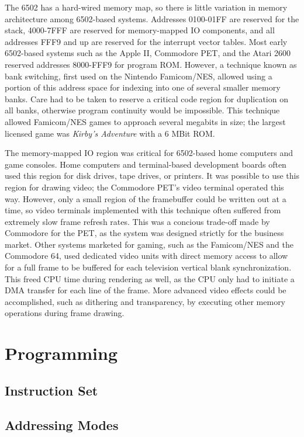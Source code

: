 \documentclass[journal]{IEEEtran}
\begin{document}
The 6502 has a hard-wired memory map, so there is little variation in memory
architecture among 6502-based systems. Addresses 0100-01FF are reserved for the
stack, 4000-7FFF are reserved for memory-mapped IO components, and all addresses
FFF9 and up are reserved for the interrupt vector tables. Most early 6502-based
systems such as the Apple II, Commodore PET, and the Atari 2600 reserved
addresses 8000-FFF9 for program ROM. However, a technique known as bank
switching, first used on the Nintendo Famicom/NES, allowed using a portion of
this address space for indexing into one of several smaller memory banks. Care
had to be taken to reserve a critical code region for duplication on all banks,
otherwise program continuity would be impossible. This technique allowed
Famicom/NES games to approach several megabits in size; the largest licensed
game was \emph{Kirby's Adventure} with a 6 MBit ROM.

The memory-mapped IO region was critical for 6502-based home computers and game
consoles. Home computers and terminal-based development boards often used this
region for disk drives, tape drives, or printers. It was possible to use this
region for drawing video; the Commodore PET's video terminal operated this way.
However, only a small region of the framebuffer could be written out at a time,
so video terminals implemented with this technique often suffered from extremely
slow frame refresh rates. This was a concious trade-off made by Commodore for
the PET, as the system was designed strictly for the business market. Other
systems marketed for gaming, such as the Famicom/NES and the Commodore 64, used
dedicated video units with direct memory access to allow for a full frame to be
buffered for each television vertical blank synchronization. This freed CPU time
during rendering as well, as the CPU only had to initiate a DMA transfer for
each line of the frame. More advanced video effects could be accomplished, such
as dithering and transparency, by executing other memory operations during frame
drawing.

\section{Programming}

\subsection{Instruction Set}

\subsection{Addressing Modes}
\end{document}
